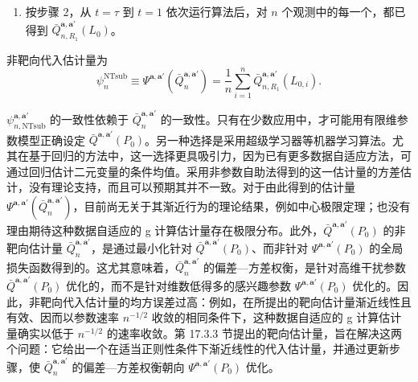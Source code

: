 \begin{enumerate}[label=\arabic*.]
\begin{enumerate}[label=(\alph*),leftmargin=2.4em]
\[  \]
  对 $\mathbf A_t,\mathbf R_{t-1},\mathbf Z_{t-1},\mathbf L_{t-1}$ 回归。在我们的例子中，自变量是截至时点 $t$ 的项目参与历史，以及截至 $t-1$ 的糖尿病教育、营养咨询出席情况、疾病进展和其他健康相关变量。然后，对这些未删失观测，在其观测到的中介与协变量历史 $\mathbf R_{t-1},\mathbf Z_{t-1},\mathbf L_{t-1}$，以及干预后的收入水平 $\mathbf A_t=\mathbf a'_t$ 处，对拟合函数求值。由此得到估计 $\bar Q_{n,R_t}^{\mathbf a,\mathbf a'}(\mathbf R_{t-1},\mathbf L_{t-1},\mathbf Z_{t-1})$。
 \end{enumerate}
 \item 按步骤 2，从 $t=\tau$ 到 $t=1$ 依次运行算法后，对 $n$ 个观测中的每一个，都已得到 $\bar Q_{n,R_1}^{\mathbf a,\mathbf a'}(L_0)$。
\end{enumerate}
非靶向代入估计量为
\begin{equation}
 \psi_n^{\mathrm{NTsub}}\equiv\Psi^{\mathbf a,\mathbf a'}(\bar Q_n^{\mathbf a,\mathbf a'})
 =\frac1n\sum_{i=1}^n\bar Q_{n,R_1}^{\mathbf a,\mathbf a'}(L_{0,i}).
 \tag{17.14}
\end{equation}

$\psi_{n,\mathrm{NTsub}}^{\mathbf a,\mathbf a'}$ 的一致性依赖于 $\bar Q_n^{\mathbf a,\mathbf a'}$ 的一致性。只有在少数应用中，才可能用有限维参数模型正确设定 $\bar Q^{\mathbf a,\mathbf a'}(P_0)$。另一种选择是采用超级学习器等机器学习算法。尤其在基于回归的方法中，这一选择更具吸引力，因为已有更多数据自适应方法，可通过回归估计二元变量的条件均值。采用非参数自助法得到的这一估计量的方差估计，没有理论支持，而且可以预期其并不一致。对于由此得到的估计量 $\Psi^{\mathbf a,\mathbf a'}(\bar Q_n^{\mathbf a,\mathbf a'})$，目前尚无关于其渐近行为的理论结果，例如中心极限定理；也没有理由期待这种数据自适应的 g 计算估计量存在极限分布。此外，$\bar Q^{\mathbf a,\mathbf a'}(P_0)$ 的非靶向估计量 $\bar Q_n^{\mathbf a,\mathbf a'}$，是通过最小化针对 $\bar Q^{\mathbf a,\mathbf a'}(P_0)$、而非针对 $\Psi^{\mathbf a,\mathbf a'}(P_0)$ 的全局损失函数得到的。这尤其意味着，$\bar Q_n^{\mathbf a,\mathbf a'}$ 的偏差—方差权衡，是针对高维干扰参数 $\bar Q^{\mathbf a,\mathbf a'}(P_0)$ 优化的，而不是针对维数低得多的感兴趣参数 $\Psi^{\mathbf a,\mathbf a'}(P_0)$ 优化的。因此，非靶向代入估计量的均方误差过高：例如，在所提出的靶向估计量渐近线性且有效、因而以参数速率 $n^{-1/2}$ 收敛的相同条件下，这种数据自适应的 g 计算估计量确实以低于 $n^{-1/2}$ 的速率收敛。第 17.3.3 节提出的靶向估计量，旨在解决这两个问题：它给出一个在适当正则性条件下渐近线性的代入估计量，并通过更新步骤，使 $\bar Q_n^{\mathbf a,\mathbf a'}$ 的偏差—方差权衡朝向 $\Psi^{\mathbf a,\mathbf a'}(P_0)$ 优化。
